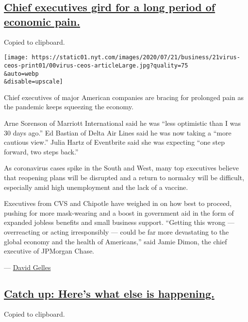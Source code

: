 \hypertarget{chief-executives-gird-for-a-long-period-of-economic-pain}{%
\subsection{\texorpdfstring{\protect\hyperlink{chief-executives-gird-for-a-long-period-of-economic-pain}{Chief
executives gird for a long period of economic
pain.}}{Chief executives gird for a long period of economic pain.}}\label{chief-executives-gird-for-a-long-period-of-economic-pain}}

Copied to clipboard.

\texttt{[image: https://static01.nyt.com/images/2020/07/21/business/21virus-ceos-print01/00virus-ceos-articleLarge.jpg?quality=75\\\&auto=webp\\\&disable=upscale]}

Chief executives of major American companies are bracing for prolonged
pain as the pandemic keeps squeezing the economy.

Arne Sorenson of Marriott International said he was ``less optimistic
than I was 30 days ago.'' Ed Bastian of Delta Air Lines said he was now
taking a ``more cautious view.'' Julia Hartz of Eventbrite said she was
expecting ``one step forward, two steps back.''

As coronavirus cases spike in the South and West, many top executives
believe that reopening plans will be disrupted and a return to normalcy
will be difficult, especially amid high unemployment and the lack of a
vaccine.

Executives from CVS and Chipotle have weighed in on how best to proceed,
pushing for more mask-wearing and a boost in government aid in the form
of expanded jobless benefits and small business support. ``Getting this
wrong --- overreacting or acting irresponsibly --- could be far more
devastating to the global economy and the health of Americans,'' said
Jamie Dimon, the chief executive of JPMorgan Chase.

--- \href{https://www.nytimes.com/by/david-gelles}{David Gelles}

\hypertarget{catch-up-heres-what-else-is-happening}{%
\subsection{\texorpdfstring{\protect\hyperlink{catch-up-heres-what-else-is-happening}{Catch
up: Here's what else is
happening.}}{Catch up: Here's what else is happening.}}\label{catch-up-heres-what-else-is-happening}}

Copied to clipboard.

